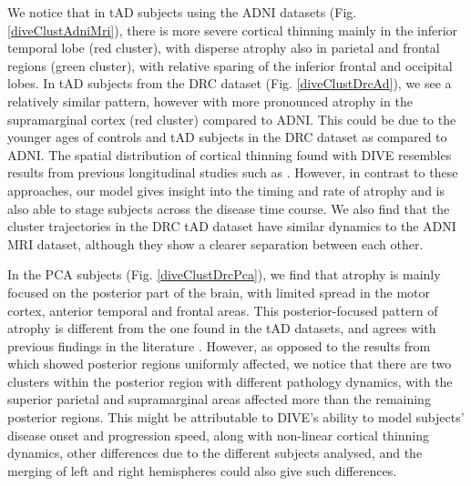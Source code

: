 We notice that in tAD subjects using the ADNI datasets (Fig. \ref{diveClustAdniMri}), there is more severe cortical thinning mainly in the inferior temporal lobe (red cluster), with disperse atrophy also in parietal and frontal regions (green cluster), with relative sparing of the inferior frontal and occipital lobes. In tAD subjects from the DRC dataset (Fig. \ref{diveClustDrcAd}), we see a relatively similar pattern, however with more pronounced atrophy in the supramarginal cortex (red cluster) compared to ADNI. This could be due to the younger ages of controls and tAD subjects in the DRC dataset as compared to ADNI. The spatial distribution of cortical thinning found with DIVE resembles results from previous longitudinal studies such as \cite{dickerson2008cortical,singh2006spatial}. However, in contrast to these approaches, our model gives insight into the timing and rate of atrophy and is also able to stage subjects across the disease time course. We also find that the cluster trajectories in the DRC tAD dataset have similar dynamics to the ADNI MRI dataset, although they show a clearer separation between each other.

In the PCA subjects (Fig. \ref{diveClustDrcPca}), we find that atrophy is mainly focused on the posterior part of the brain, with limited spread in the motor cortex, anterior temporal and frontal areas. This posterior-focused pattern of atrophy is different from the one found in the tAD datasets, and agrees with previous findings in the literature \cite{crutch2012posterior,lehmann2011cortical}.  However, as opposed to the results from \cite{lehmann2011cortical} which showed posterior regions uniformly affected, we notice that there are two clusters within the posterior region with different pathology dynamics, with the superior parietal and supramarginal areas affected more than the remaining posterior regions. This might be attributable to DIVE's ability to model subjects' disease onset and progression speed, along with non-linear cortical thinning dynamics, other differences due to the different subjects analysed, and the merging of left and right hemispheres could also give such differences.

